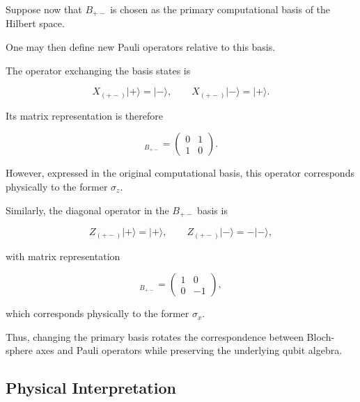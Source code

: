 Suppose now that \( B_{+-} \) is chosen as the primary computational basis of the Hilbert space.

One may then define new Pauli operators relative to this basis.

The operator exchanging the basis states is

\begin{equation}
X_{(+-)}
|+\rangle
=
|-\rangle,
\qquad
X_{(+-)}
|-\rangle
=
|+\rangle.
\label{eq:new_x_operator_plus_minus}
\end{equation}

Its matrix representation is therefore

\begin{equation}
[X_{(+-)}]_{B_{+-}}
=
\begin{pmatrix}
0 & 1 \\
1 & 0
\end{pmatrix}.
\label{eq:new_x_matrix_plus_minus}
\end{equation}

However, expressed in the original computational basis, this operator corresponds physically to the former \( \sigma_z \).

\medskip

Similarly, the diagonal operator in the \( B_{+-} \) basis is

\begin{equation}
Z_{(+-)}
|+\rangle
=
|+\rangle,
\qquad
Z_{(+-)}
|-\rangle
=
-|-\rangle,
\label{eq:new_z_operator_plus_minus}
\end{equation}

with matrix representation

\begin{equation}
[Z_{(+-)}]_{B_{+-}}
=
\begin{pmatrix}
1 & 0 \\
0 & -1
\end{pmatrix},
\label{eq:new_z_matrix_plus_minus}
\end{equation}

which corresponds physically to the former \( \sigma_x \).

\medskip

Thus, changing the primary basis rotates the correspondence between Bloch-sphere axes and Pauli operators while preserving the underlying qubit algebra.


\subsection*{Physical Interpretation}

